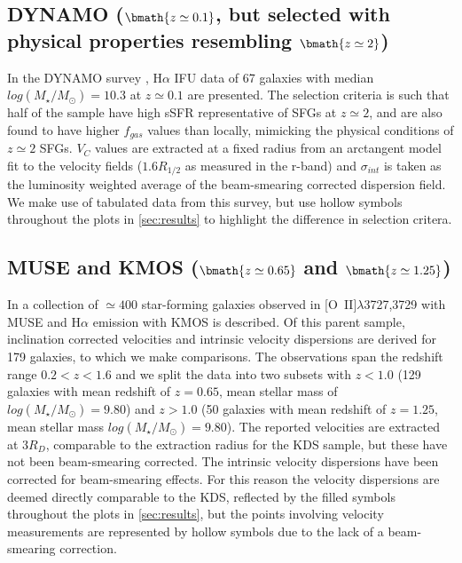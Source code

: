 \documentclass[fleqn,usenatbib]{mnras}
\begin{document}
\subsection{DYNAMO ($\bmath{z\simeq0.1}$, but selected with physical properties resembling $\bmath{z\simeq2}$)}\label{subsec:DYNAMO}
In the DYNAMO survey \citep[G14]{Green2014}, H$\alpha$ IFU data of 67 galaxies with median $log(M_{\star}/M_{\odot})=10.3$ at $z\simeq0.1$ are presented.
The selection criteria is such that half of the sample have high sSFR representative of SFGs at $z\simeq2$, and are also found to have higher $f_{gas}$ values than locally, mimicking the physical conditions of $z\simeq2$ SFGs.
$V_{C}$ values are extracted at a fixed radius from an arctangent model fit to the velocity fields ($1.6R_{1/2}$ as measured in the r-band) and $\sigma_{int}$ is taken as the luminosity weighted average of the beam-smearing corrected dispersion field.
We make use of tabulated data from this survey, but use hollow symbols throughout the plots in \cref{sec:results} to highlight the difference in selection critera.

\subsection{MUSE and KMOS ($\bmath{z\simeq0.65}$ and $\bmath{z\simeq1.25}$)}\label{subsec:MUSE_and_KMOS}
In \cite{Swinbank2017} a collection of $\simeq400$ star-forming galaxies observed in [O~{\sc II}]$\lambda$3727,3729 with MUSE and H$\alpha$ emission with KMOS is described.
Of this parent sample, inclination corrected velocities and intrinsic velocity dispersions are derived for 179 galaxies, to which we make comparisons.
The observations span the redshift range $0.2 < z < 1.6$ and we split the data into two subsets with $z < 1.0$ (129 galaxies with mean redshift of $z = 0.65$, mean stellar mass of $log(M_{\star}/M_{\odot})=9.80$) and $z > 1.0$ (50 galaxies with mean redshift of $z = 1.25$, mean stellar mass $log(M_{\star}/M_{\odot})=9.80$).
The reported velocities are extracted at $3R_{D}$, comparable to the extraction radius for the KDS sample, but these have not been beam-smearing corrected.
The intrinsic velocity dispersions have been corrected for beam-smearing effects.
For this reason the velocity dispersions are deemed directly comparable to the KDS, reflected by the filled symbols throughout the plots in \cref{sec:results}, but the points involving velocity measurements are represented by hollow symbols due to the lack of a beam-smearing correction.
\end{document}
